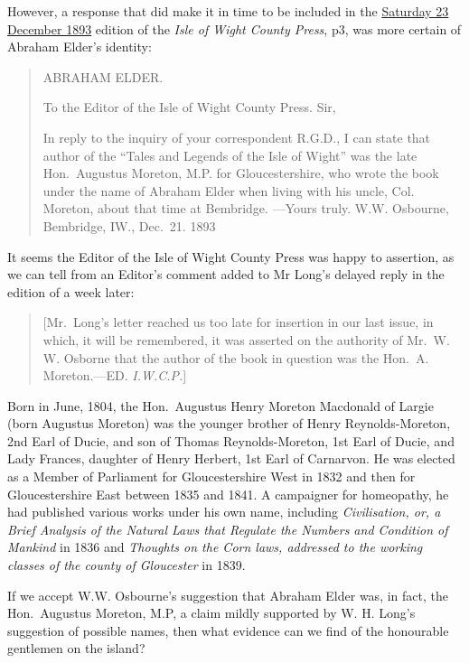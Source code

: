 \documentclass[
  12pt,
  a5paper,
  twoside]{book}
\begin{document}
However, a response that did make it in time to be included in the
\href{https://www.britishnewspaperarchive.co.uk/viewer/bl/0001960/18931223/040/0003}{Saturday
23 December 1893} edition of the \emph{Isle of Wight County Press}, p3,
was more certain of Abraham Elder's identity:

\begin{quote}
ABRAHAM ELDER.

To the Editor of the Isle of Wight County Press. Sir,

In reply to the inquiry of your correspondent R.G.D., I can state that
author of the ``Tales and Legends of the Isle of Wight'' was the late
Hon.~Augustus Moreton, M.P. for Gloucestershire, who wrote the book
under the name of Abraham Elder when living with his uncle, Col.
Moreton, about that time at Bembridge. ---Yours truly. W.W. Osbourne,
Bembridge, IW., Dec.~21. 1893
\end{quote}

It seems the Editor of the Isle of Wight County Press was happy to
assertion, as we can tell from an Editor's comment added to Mr Long's
delayed reply in the edition of a week later:

\begin{quote}
{[}Mr.~Long's letter reached us too late for insertion in our last
issue, in which, it will be remembered, it was asserted on the authority
of Mr.~W. W. Osborne that the author of the book in question was the
Hon.~A. Moreton.---ED. \emph{I.W.C.P.}{]}
\end{quote}

Born in June, 1804, the Hon.~Augustus Henry Moreton Macdonald of Largie
(born Augustus Moreton) was the younger brother of Henry
Reynolds-Moreton, 2nd Earl of Ducie, and son of Thomas Reynolds-Moreton,
1st Earl of Ducie, and Lady Frances, daughter of Henry Herbert, 1st Earl
of Carnarvon. He was elected as a Member of Parliament for
Gloucestershire West in 1832 and then for Gloucestershire East between
1835 and 1841. A campaigner for homeopathy, he had published various
works under his own name, including \emph{Civilisation, or, a Brief
Analysis of the Natural Laws that Regulate the Numbers and Condition of
Mankind} in 1836 and \emph{Thoughts on the Corn laws, addressed to the
working classes of the county of Gloucester} in 1839.

If we accept W.W. Osbourne's suggestion that Abraham Elder was, in fact,
the Hon.~Augustus Moreton, M.P, a claim mildly supported by W. H. Long's
suggestion of possible names, then what evidence can we find of the
honourable gentlemen on the island?
\end{document}
